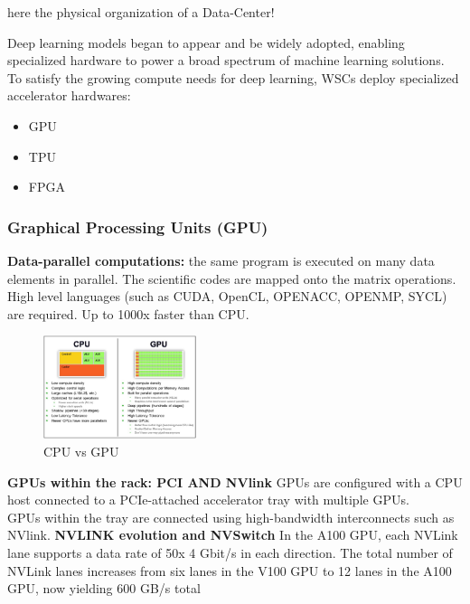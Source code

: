 \documentclass[10pt, oneside]{article}
\begin{document}
here the physical organization of a Data-Center!\\
\newline



Deep learning models began to appear and be widely adopted, enabling specialized hardware to power a broad spectrum of machine learning solutions. To satisfy the growing compute needs for deep learning, WSCs deploy specialized accelerator hardwares:
\begin{itemize}
    \item GPU
    \item TPU
    \item FPGA
\end{itemize}
\subsubsection{Graphical Processing Units (GPU)}
\textbf{Data-parallel computations:}
the same program is executed on many data elements in parallel. The scientific codes are mapped onto the matrix operations. High level languages (such as CUDA, OpenCL, OPENACC, OPENMP, SYCL) are required. Up to 1000x faster than CPU.
\begin{figure}[H]
    \begin{center}
    \includegraphics[width=0.4\textwidth]{img/img9.png}
    \caption{CPU vs GPU}
    \label{fig:CPU vs GPU}
    \end{center}
\end{figure}
\textbf{GPUs within the rack: PCI AND NVlink}
GPUs are configured with a CPU host connected to a PCIe-attached accelerator tray with multiple GPUs.\\GPUs within the tray are connected using high-bandwidth interconnects such as NVlink.
\textbf{NVLINK evolution and NVSwitch}
In the A100 GPU, each NVLink lane supports a data rate of 50x 4 Gbit/s in each direction. The total number of NVLink lanes increases from six lanes in the V100 GPU to 12 lanes in the A100 GPU, now yielding 600 GB/s total
\end{document}
